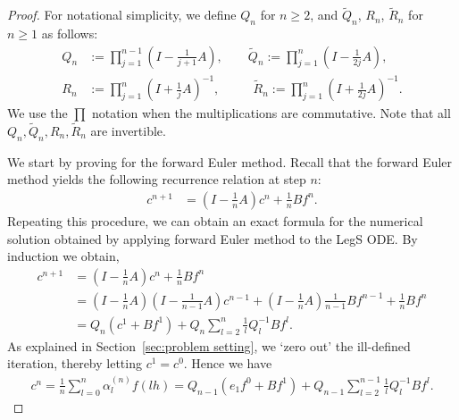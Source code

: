 \documentclass{article}
\theoremstyle{definition}
\newcommand{\pr}[1]{ \left( #1 \right) }
\begin{document}
\begin{proof}

    For notational simplicity, we define $Q_n$ for $n \geq 2$, and $\tilde{Q}_n$, $R_n$, $\tilde{R}_n$ for $n \geq 1$ as follows:
    \begin{align*}
        Q_n &:= \prod_{j=1}^{n-1} \pr{I - \frac{1}{j+1}A}, \qquad
        \tilde{Q}_n := \prod_{j=1}^n \pr{I - \frac{1}{2j}A}, \\
        R_n &:= \prod_{j=1}^n \pr{I + \frac{1}{j}A}^{-1}, \qquad\,\,\,\,
        \tilde{R}_n := \prod_{j=1}^n \pr{I + \frac{1}{2j}A}^{-1}.
    \end{align*}
    We use the $\prod$ notation when the multiplications are commutative. Note that all $Q_n, \tilde{Q}_n, R_n, \tilde{R}_n$ are invertible. 
    
    We start by proving for the forward Euler method. 
    Recall that the forward Euler method yields the following recurrence relation at step $n$:
\begin{align*}
    c^{n+1} &= \pr{ I - \frac{1}{n}A}c^n + \frac{1}{n} B f^n.
\end{align*}
Repeating this procedure, we can obtain an exact formula for the numerical solution obtained by applying forward Euler method to the LegS ODE. By induction we obtain,
\begin{align*}
    c^{n+1} 
    &= \pr{ I - \frac{1}{n}A }c^n + \frac{1}{n}Bf^n \\
    &= \pr{ I - \frac{1}{n}A} \pr{ I - \frac{1}{n-1}A} c^{n-1} + \pr{ I - \frac{1}{n}A} \frac{1}{n-1}Bf^{n-1} + \frac{1}{n}Bf^n \\
    &= Q_n \pr{c^1 + Bf^1} + Q_n \sum_{l=2}^n \frac{1}{l} Q_{l}^{-1} B f^l.
\end{align*}
As explained in Section~\ref{sec:problem setting}, we `zero out' the ill-defined iteration, thereby letting $c^1=c^0$. Hence we have
\begin{align} \label{eq:forward_numsol}
    c^{n}  
    = \frac{1}{n} \sum_{l=0}^n \alpha^{(n)}_l f(lh)
    = Q_{n-1} (e_1 f^0 + B f^1 ) +  Q_{n-1} \sum_{l=2}^{n-1} \frac{1}{l} Q_l^{-1} B f^l.
\end{align}


\end{proof}
\end{document}
